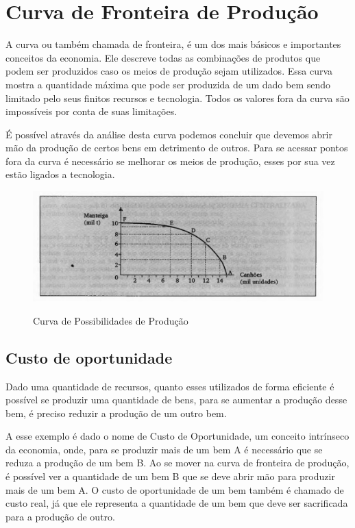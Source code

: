 \section{Curva de Fronteira de Produção}
A curva ou também chamada de fronteira, é um dos mais básicos e importantes conceitos da economia. Ele descreve todas as combinações de produtos que podem ser produzidos caso os meios de produção sejam utilizados. Essa curva mostra a quantidade máxima que pode ser produzida de um dado bem sendo limitado pelo seus finitos recursos e tecnologia. Todos os valores fora da curva são impossíveis por conta de suas limitações.\par
É possível através da análise desta curva podemos concluir que devemos abrir mão da produção de certos bens em detrimento de outros. Para se acessar pontos fora da curva é necessário se melhorar os meios de produção, esses por sua vez estão ligados a tecnologia.\par
\begin{figure}[!ht]
    \centering
    \includegraphics[width=\textwidth]{curva.jpg}
    \caption{Curva de Possibilidades de Produção}\citep{emm}
    \label{fig:cpp}
\end{figure}
\subsection{Custo de oportunidade}
Dado uma quantidade de recursos, quanto esses utilizados de forma eficiente é possível se produzir uma quantidade de bens, para se aumentar a produção desse bem, é preciso reduzir a produção de um outro bem.\par
A esse exemplo é dado o nome de Custo de Oportunidade, um conceito intrínseco da economia, onde, para se produzir mais de um bem A é necessário que se reduza a produção de um bem B. Ao se mover na curva de fronteira de produção, é possível ver a quantidade de um bem B que se deve abrir mão para produzir mais de um bem A. O custo de oportunidade de um bem também é chamado de custo real, já que ele representa a quantidade de um bem que deve ser sacrificada para a produção de outro.\par
\clearpage